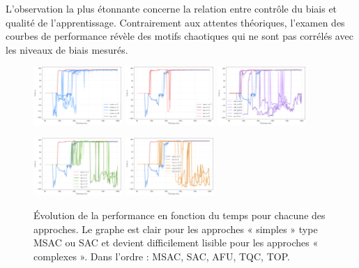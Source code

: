 \documentclass[a4paper, 12pt]{report}
\begin{document}
    L'observation la plus étonnante concerne la relation entre contrôle du
    biais et qualité de l'apprentissage. Contrairement aux attentes théoriques,
    l'examen des courbes de performance révèle des motifs chaotiques qui ne
    sont pas corrélés avec les niveaux de biais mesurés.

    \begin{figure}[htbp]
        \centering
        \includegraphics[width=0.3\textwidth]{../figures/env_returns_msac.png}
        \hfill
        \includegraphics[width=0.3\textwidth]{../figures/env_returns_sac.png}
        \hfill
        \includegraphics[width=0.3\textwidth]{../figures/env_returns_afu.png}

        \vspace{0.5cm}
        \includegraphics[width=0.3\textwidth]{../figures/env_returns_tqc.png}
        \quad
        \includegraphics[width=0.3\textwidth]{../figures/env_returns_top.png}
        \caption{Évolution de la performance en fonction du temps pour chacune
        des approches. Le graphe est clair pour les approches « simples » type
        MSAC ou SAC et devient difficilement lisible pour les approches
        « complexes ». Dans l'ordre : MSAC, SAC, AFU, TQC, TOP.}
        \label{fig:performance-evolution}
    \end{figure}
\end{document}
